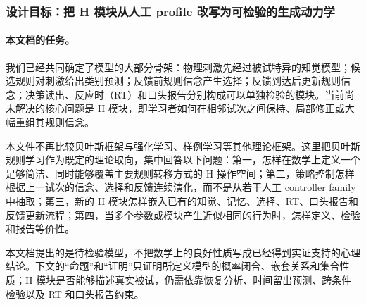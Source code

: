 
\subsubsection{设计目标：把 H 模块从人工 profile 改写为可检验的生成动力学}

\paragraph{本文档的任务。}
我们已经共同确定了模型的大部分骨架：物理刺激先经过被试特异的知觉模型；候选规则对刺激给出类别预测；反馈前规则信念产生选择；反馈到达后更新规则信念；决策读出、反应时（RT）和口头报告分别构成可以单独检验的模块。当前尚未解决的核心问题是 H 模块，即学习者如何在相邻试次之间保持、局部修正或大幅重组其规则信念。

本文件不再比较贝叶斯框架与强化学习、样例学习等其他理论框架。这里把贝叶斯规则学习作为既定的理论取向，集中回答以下问题：第一，怎样在数学上定义一个足够简洁、同时能够覆盖主要规则转移方式的 H 操作空间；第二，策略控制怎样根据上一试次的信念、选择和反馈连续演化，而不是从若干人工 controller family 中抽取；第三，新的 H 模块怎样嵌入已有的知觉、记忆、选择、RT、口头报告和反馈更新流程；第四，当多个参数或模块产生近似相同的行为时，怎样定义、检验和报告等价性。

本文档提出的是待检验模型，不把数学上的良好性质写成已经得到实证支持的心理结论。下文的“命题”和“证明”只证明所定义模型的概率闭合、嵌套关系和集合性质；H 模块是否能够描述真实被试，仍需依靠恢复分析、时间留出预测、跨条件检验以及 RT 和口头报告约束。

